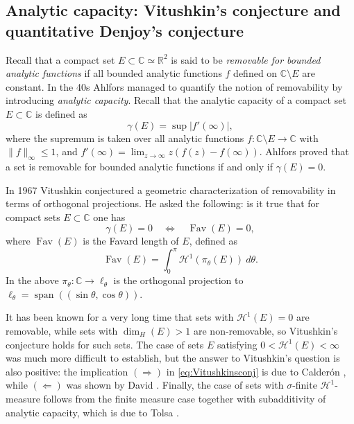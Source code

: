 \documentclass[11pt,reqno]{amsart}
\def\bC{{\mathbb{C}}}
\def\spn{\mathop\mathrm{span}}
\def\dim{\mathop\mathrm{dim}} 					%
\theoremstyle{definition}
\theoremstyle{remark}
\numberwithin{equation}{section}
\newcommand{\R}{\mathbb{R}}
\newcommand{\dH}{\mathcal{H}}
\DeclareMathOperator{\Fav}{Fav}
\theoremstyle{theorem}
\theoremstyle{definition}
\theoremstyle{remark}
\numberwithin{equation}{section}
\begin{document}
	\subsection{Analytic capacity: Vitushkin's conjecture and quantitative Denjoy's conjecture}
	Recall that a compact set $E\subset\bC\simeq \R^2$ is said to be \emph{removable for bounded analytic functions} if all bounded analytic functions $f$ defined on $\bC\setminus E$ are constant. In the 40s Ahlfors \cite{ahlfors1947bounded} managed to quantify the notion of removability by introducing \emph{analytic capacity}. Recall that the analytic capacity of a compact set $E\subset\bC$ is defined as
	\begin{equation*}
		\gamma(E) = \sup |f'(\infty)|,
	\end{equation*}
	where the supremum is taken over all analytic functions $f:\bC\setminus E\to\bC$ with $\|f\|_\infty\le 1$, and $f'(\infty) = \lim_{z\to\infty} z(f(z)-f(\infty))$. Ahlfors proved that a set is removable for bounded analytic functions if and only if $\gamma(E)=0$.
	
	In 1967 Vitushkin \cite{vitushkin1967analytic} conjectured a geometric characterization of removability in terms of orthogonal projections. He asked the following: is it true that for compact sets $E\subset\bC$ one has
	\begin{equation}\label{eq:Vitushkinsconj}
		\gamma(E)=0\quad\Leftrightarrow\quad \Fav(E)=0,
	\end{equation}
	where $\Fav(E)$ is the Favard length of $E$, defined as
	\begin{equation*}
	\Fav(E)=\int_0^\pi\mathcal{H}^1(\pi_\theta(E))\ d\theta.
	\end{equation*}
	In the above $\pi_\theta:\bC\to \ell_\theta$ is the orthogonal projection to $\ell_\theta = \spn((\sin\theta,\cos\theta))$.
	
	It has been known for a very long time that sets with $\dH^1(E)=0$ are removable, while sets with $\dim_H(E)>1$ are non-removable, so Vitushkin's conjecture holds for such sets. The case of sets $E$ satisfying $0<\mathcal{H}^1(E)<\infty$ was much more difficult to establish, but the answer to Vitushkin's question is also positive: the implication $(\Rightarrow)$ in \eqref{eq:Vitushkinsconj} is due to Calderón \cite{calderon1977cauchy}, while $(\Leftarrow)$ was shown by David \cite{david1998unrectifiable}. Finally, the case of sets with $\sigma$-finite $\dH^1$-measure follows from the finite measure case together with subadditivity of analytic capacity, which is due to Tolsa \cite{tolsa2003painleve}.
	
\end{document}

